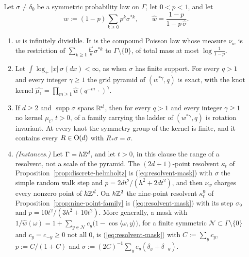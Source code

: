 \begin{proposition}
\label{prop:resolvent-masks-exact}

Let $\sigma \ne \delta_0$ be a symmetric probability law on $\Gamma$, let $0 < p < 1$, and let
\begin{equation}\label{eq:resolvent-mask}
w := (1 - p)\sum_{k \ge 0}p^k\sigma^{*k}, \qquad \widehat{w} = \frac{1 - p}{1 - p\,\widehat{\sigma}} .
\end{equation}
\begin{enumerate}
\item $w$ is infinitely divisible. It is the compound Poisson law whose \Levy{} measure $\nu_w$ is
the restriction of $\sum_{k \ge 1}\tfrac{p^k}{k}\sigma^{*k}$ to $\Gamma \setminus \{0\}$, of total
mass at most $\log\frac{1}{1-p}$.
\item Let $\int\log_+|x|\,\sigma(dx) < \infty$, as when $\sigma$ has finite support. For every
$q > 1$ and every integer $\gamma \ge 1$ the grid pyramid of $(w^{*\gamma}, q)$ is exact, with the
knot kernel
$\widehat{\mu_1} = \prod_{m \ge 1}\widehat{w}(q^{-m}\,\cdot)^\gamma$.
\item If $d \ge 2$ and $\operatorname{supp}\sigma$ spans $\mathbb{R}^d$, then for every $q > 1$ and every
integer $\gamma \ge 1$ no kernel $\mu_t$, $t > 0$, of a family carrying the ladder of
$(w^{*\gamma}, q)$ is rotation invariant. At every knot the symmetry group of the kernel is
finite, and it contains every $R \in \mathrm{O}(d)$ with $R_*\sigma = \sigma$.
\item \emph{(Instances.)} Let $\Gamma = h\mathbb{Z}^d$, and let $t > 0$, in this clause the range of a
resolvent, not a scale of the pyramid. The $(2d+1)$-point resolvent $\kappa_t$ of
Proposition~\ref{prop:discrete-helmholtz} is (\ref{eq:resolvent-mask}) with $\sigma$ the simple
random walk step and $p = 2dt^2/(h^2 + 2dt^2)$, and then $\nu_w$ charges every nonzero point
of $h\mathbb{Z}^d$. On $h\mathbb{Z}^2$ the nine-point resolvent $\kappa^9_t$ of
Proposition~\ref{prop:nine-point-family} is (\ref{eq:resolvent-mask}) with its step $\sigma_9$ and
$p = 10t^2/(3h^2 + 10t^2)$. More generally, a mask with
$1/\widehat{w}(\omega) = 1 + \sum_{y \in \mathcal{N}}c_y\bigl(1 - \cos\langle\omega, y\rangle\bigr)$,
for a finite symmetric $\mathcal{N} \subset \Gamma \setminus \{0\}$ and $c_y = c_{-y} \ge 0$ not
all $0$, is (\ref{eq:resolvent-mask}) with $C := \sum_yc_y$, $p := C/(1 + C)$ and
$\sigma := (2C)^{-1}\sum_yc_y(\delta_y + \delta_{-y})$.
\end{enumerate}
\end{proposition}

